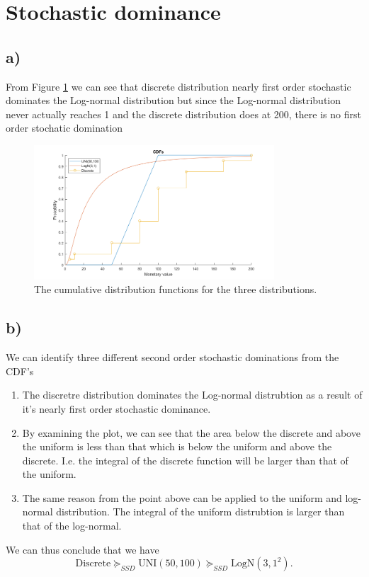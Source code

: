 \documentclass{article}
\begin{document}
\section{Stochastic dominance}
\subsection{a)}
	From Figure \ref{fig:5} we can see that discrete distribution nearly first order stochastic dominates the Log-normal distribution but since the Log-normal distribution never actually reaches 1 and the discrete distribution does at 200, there is no first order stochatic domination
	
	\begin{figure}[H]
		\includegraphics[width=0.8\textwidth]{5.png}
		\caption{The cumulative distribution functions for the three distributions.}
		\label{fig:5}
	\end{figure}
\subsection{b)}
	We can identify three different second order stochastic dominations from the CDF's
	\begin{enumerate}
		\item The discretre distribution dominates the Log-normal distrubtion as a result of it's nearly first order stochastic dominance.
		\item By examining the plot, we can see that the area below the discrete and above the uniform is less than that which is below the uniform and above the discrete. I.e. the integral of the discrete function will be larger than that of the uniform.
		\item  The same reason from the point above can be applied to the uniform and log-normal distribution. The integral of the uniform distrubtion is larger than that of the log-normal.
	\end{enumerate}
		We can thus conclude that we have
		\begin{equation}
			\text{Discrete} \succcurlyeq_{SSD} \text{UNI}(50,100) \succcurlyeq_{SSD} \text{LogN}(3,1^2).
		\end{equation}
\end{document}
